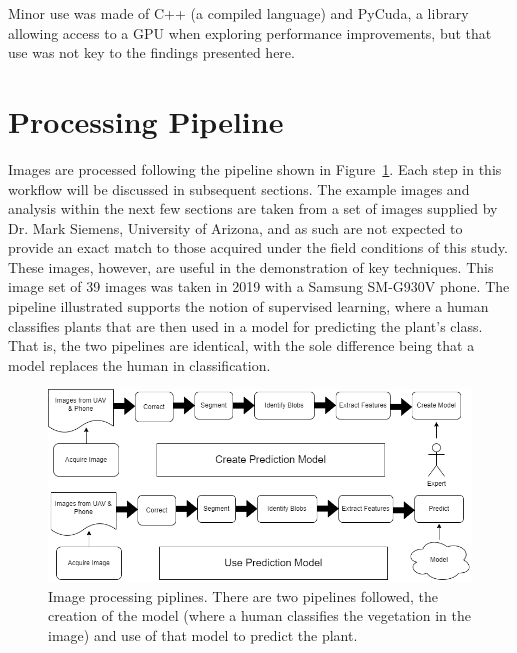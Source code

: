 \documentclass[letterpaper]{report}
\begin{document}
Minor use was made of C++ (a compiled language) and PyCuda, a library allowing access to a GPU when exploring performance improvements, but  that use was not key to the findings presented here.

\section{Processing Pipeline}
Images are processed following the pipeline shown in Figure~\ref{fig:workflow}. Each step in this workflow will be discussed in subsequent sections. The example images and analysis within the next few sections are taken from a set of images supplied by Dr. Mark Siemens, University of Arizona, and as such are not expected to provide an exact match to those acquired under the field conditions of this study. These images, however, are useful in the demonstration of key techniques. This image set of 39 images was taken in 2019 with a Samsung SM-G930V phone. The pipeline illustrated supports the notion of supervised learning, where a human classifies plants that are then used in a model for predicting the plant's class. That is, the two pipelines are identical, with the sole difference being that a model replaces the human in classification. 
\begin{figure}[H]
	\centering
	\includegraphics[width=0.85\linewidth]{./figures/workflow.png}
	\caption[Image processing workflow]{Image processing piplines. There are two pipelines followed, the creation of the model (where a human classifies the vegetation in the image) and use of that model to predict the plant.}
	\label{fig:workflow}	
\end{figure}
\end{document}

